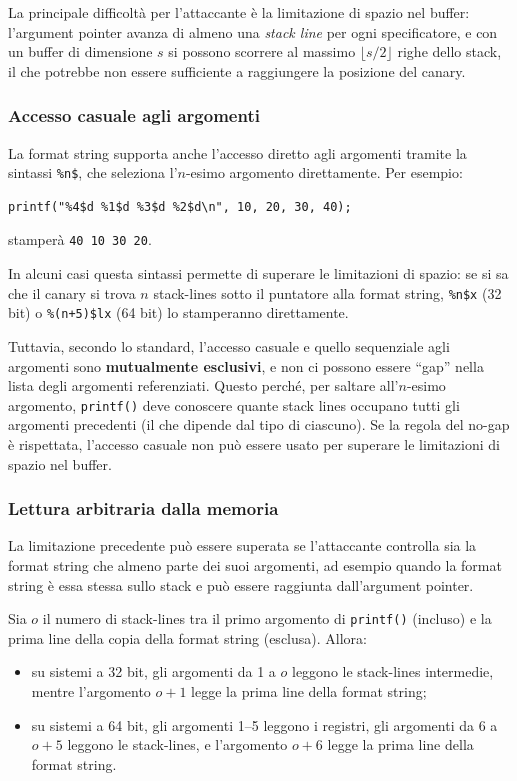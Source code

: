 \documentclass{article}
\begin{document}
La principale difficoltà per l'attaccante è la limitazione di spazio nel buffer: l'argument pointer avanza di almeno una \textit{stack line} per ogni specificatore, e con un buffer di dimensione $s$ si possono scorrere al massimo $\lfloor s/2 \rfloor$ righe dello stack, il che potrebbe non essere sufficiente a raggiungere la posizione del canary.

\subsubsection*{Accesso casuale agli argomenti}

La format string supporta anche l'accesso diretto agli argomenti tramite la sintassi \texttt{\%n\$}, che seleziona l'$n$-esimo argomento direttamente. Per esempio:

\begin{verbatim}
printf("%4$d %1$d %3$d %2$d\n", 10, 20, 30, 40);
\end{verbatim}

stamperà \texttt{40 10 30 20}.

In alcuni casi questa sintassi permette di superare le limitazioni di spazio: se si sa che il canary si trova $n$ stack-lines sotto il puntatore alla format string, \texttt{\%n\$x} (32 bit) o \texttt{\%(n+5)\$lx} (64 bit) lo stamperanno direttamente.

Tuttavia, secondo lo standard, l'accesso casuale e quello sequenziale agli argomenti sono \textbf{mutualmente esclusivi}, e non ci possono essere ``gap'' nella lista degli argomenti referenziati. Questo perché, per saltare all'$n$-esimo argomento, \texttt{printf()} deve conoscere quante stack lines occupano tutti gli argomenti precedenti (il che dipende dal tipo di ciascuno). Se la regola del no-gap è rispettata, l'accesso casuale non può essere usato per superare le limitazioni di spazio nel buffer.

\subsubsection*{Lettura arbitraria dalla memoria}

La limitazione precedente può essere superata se l'attaccante controlla sia la format string che almeno parte dei suoi argomenti, ad esempio quando la format string è essa stessa sullo stack e può essere raggiunta dall'argument pointer.

Sia $o$ il numero di stack-lines tra il primo argomento di \texttt{printf()} (incluso) e la prima line della copia della format string (esclusa). Allora:
\begin{itemize}
    \item su sistemi a 32 bit, gli argomenti da 1 a $o$ leggono le stack-lines intermedie, mentre l'argomento $o+1$ legge la prima line della format string;
    \item su sistemi a 64 bit, gli argomenti 1--5 leggono i registri, gli argomenti da 6 a $o+5$ leggono le stack-lines, e l'argomento $o+6$ legge la prima line della format string.
\end{itemize}
\end{document}
